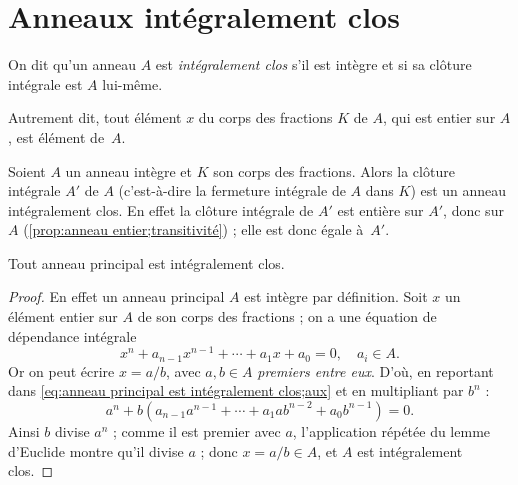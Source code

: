 \documentclass[11pt, %
  title in boldface,
  theorem in new line,
  theorem numbering = section,
  number theorems separately,
  simple name,
]{beaulivre}
\begin{document}
\section{Anneaux intégralement clos}

    \begin{definition}
        On dit qu'un anneau \( A \) est \emph{intégralement clos} s'il est intègre et si sa clôture intégrale est \( A \) lui-même.
    \end{definition}

    Autrement dit, tout élément \( x \) du corps des fractions \( K \) de \( A \), qui est entier sur \( A \), est élément de~\( A \).

    \begin{example*}
        Soient \( A \) un anneau intègre et \( K \) son corps des fractions.  Alors la clôture intégrale \( A' \) de \( A \) (c'est-à-dire la fermeture intégrale de \( A \) dans \( K \)) est un anneau intégralement clos. En effet la clôture intégrale de \( A' \) est entière sur \( A' \), donc sur \( A \) (\cref{prop:anneau entier;transitivité}) ; elle est donc égale à~\( A' \).
    \end{example*}

\enlargethispage{-\baselineskip}
    \begin{example*}\label{exp:anneau principal est intégralement clos}
        Tout anneau principal est intégralement clos.
    \end{example*}
    \begin{proof}
        En effet un anneau principal \( A \) est intègre par définition. Soit \( x \) un élément entier sur \( A \) de son corps des fractions ; on a une équation de dépendance intégrale
        \begin{equation}\label{eq:anneau principal est intégralement clos;aux}
            x^n + a_{n-1} x^{n-1} + \cdots + a_1 x + a_0 = 0, \quad a_i \in A.
        \end{equation}
        Or on peut écrire \( x = a/b \), avec \( a,b \in A \) \emph{premiers entre eux}. D'où, en reportant dans \eqref{eq:anneau principal est intégralement clos;aux} et en multipliant par \( b^n \) :
        \[
            a^n + b(a_{n-1} a^{n-1} + \cdots + a_1 a b^{n-2} + a_0 b^{n-1}) = 0.
        \]
        Ainsi \( b \) divise \( a^n \) ; comme il est premier avec \( a \), l'application répétée du lemme d'Euclide montre qu'il divise \( a \) ; donc \( x = a/b \in A \), et \( A \) est intégralement clos.
    \end{proof}
\end{document}
